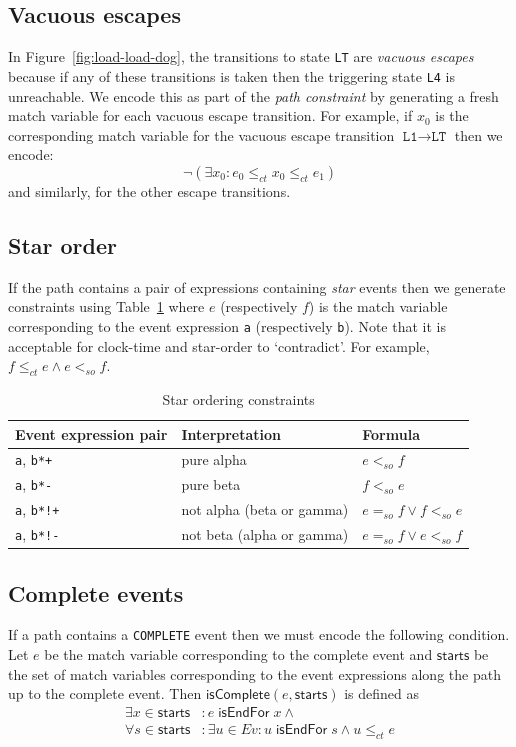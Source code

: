 \documentclass[10pt]{paper}
\newcommand{\state}[1]{\texttt{#1}}
\begin{document}
\subsection{Vacuous escapes}
%
In Figure~\ref{fig:load-load-dog}, the transitions to state \state{LT} are \emph{vacuous escapes} because if any of these transitions is taken then the triggering state \state{L4} is unreachable.
%
We encode this as part of the \emph{path constraint} by generating a fresh match variable for each vacuous escape transition.
%
For example, if $x_0$ is the corresponding match variable for the vacuous escape transition $\state{L1} \rightarrow \state{LT}$ then we encode:
\[
\neg (\exists x_0 : e_0 \leq_{ct} x_0 \leq_{ct} e_1)
\]
%
and similarly, for the other escape transitions.

\subsection{Star order}
%
If the path contains a pair of expressions containing \emph{star} events then we generate constraints using Table~\ref{table:star} where $e$ (respectively $f$) is the match variable corresponding to the event expression \texttt{a} (respectively \texttt{b}).
%
Note that it is acceptable for clock-time and star-order to `contradict'.
%
For example, $f \leq_{ct} e \wedge e <_{so} f$.

\begin{table}[h]
\caption{Star ordering constraints}
\label{table:star}
\begin{tabular}{lll}
\toprule
\textbf{Event expression pair} & \textbf{Interpretation}   & \textbf{Formula} \\
\midrule
\texttt{a}, \texttt{b*+}       & pure alpha                & $e <_{so} f$ \\
\texttt{a}, \texttt{b*-}       & pure beta                 & $f <_{so} e$ \\
\texttt{a}, \texttt{b*!+}      & not alpha (beta or gamma) & $e =_{so} f \vee f <_{so} e$ \\
\texttt{a}, \texttt{b*!-}      & not beta (alpha or gamma) & $e =_{so} f \vee e <_{so} f$ \\
\bottomrule
\end{tabular}
\end{table}

\subsection{Complete events}
%
If a path contains a \texttt{COMPLETE} event then we must encode the following condition.
%
Let $e$ be the match variable corresponding to the complete event and $\mathsf{starts}$ be the set of match variables corresponding to the event expressions along the path up to the complete event.
%
Then $\mathsf{isComplete}(e, \mathsf{starts})$ is defined as
%
\begin{align*}
\exists x \in \mathsf{starts} & : e\; \mathsf{isEndFor}\; x \wedge \\
\forall s \in \mathsf{starts} & : \exists u \in Ev : u\; \mathsf{isEndFor}\; s \wedge u \leq_{ct} e \\
\end{align*}
\end{document}
